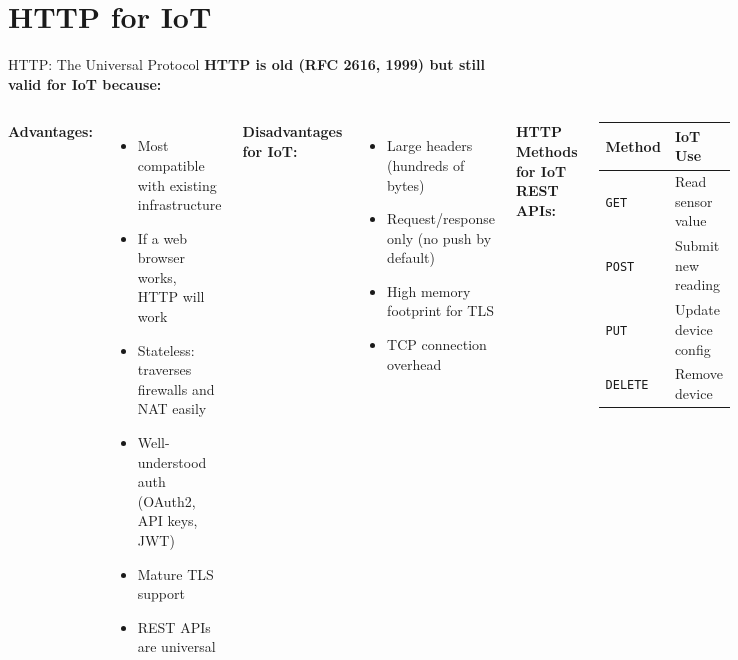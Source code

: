 \documentclass[aspectratio=169,11pt]{beamer}
\begin{document}
\section{HTTP for IoT}

\begin{frame}{HTTP: The Universal Protocol}
    \textbf{HTTP is old (RFC 2616, 1999) but still valid for IoT because:}
    
    \vspace{0.2cm}
    \begin{columns}
        \textbf{Advantages:}
        \begin{itemize}
            \item Most compatible with existing infrastructure
            \item If a web browser works, HTTP will work
            \item Stateless: traverses firewalls and NAT easily
            \item Well-understood auth (OAuth2, API keys, JWT)
            \item Mature TLS support
            \item REST APIs are universal
        \end{itemize}
        
        \vspace{0.2cm}
        \textbf{Disadvantages for IoT:}
        \begin{itemize}
            \item Large headers (hundreds of bytes)
            \item Request/response only (no push by default)
            \item High memory footprint for TLS
            \item TCP connection overhead
        \end{itemize}
        
        \textbf{HTTP Methods for IoT REST APIs:}
        \begin{center}
        \begin{tabular}{ll}
            \toprule
            \textbf{Method} & \textbf{IoT Use} \\
            \midrule
            \texttt{GET} & Read sensor value \\
            \texttt{POST} & Submit new reading \\
            \texttt{PUT} & Update device config \\
            \texttt{DELETE} & Remove device \\
            \bottomrule
        \end{tabular}
        \end{center}
        

\end{columns}
\end{frame}
\end{document}
